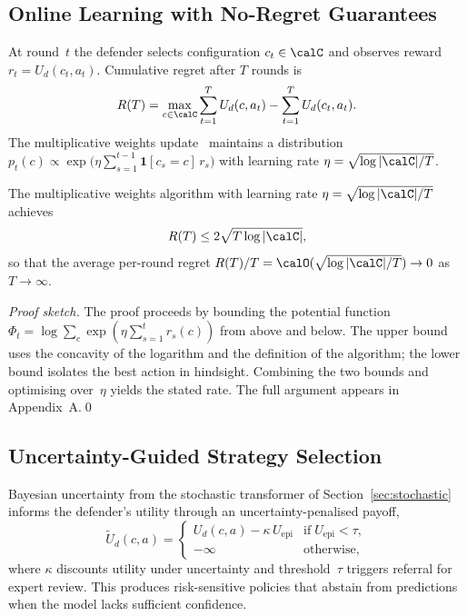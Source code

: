 \subsection{Online Learning with No-Regret Guarantees}

At round~$t$ the defender selects configuration $c_t\in\calC$ and observes reward $r_t=U_d(c_t,a_t)$. Cumulative regret after $T$ rounds is
\begin{equation}
R(T)
= \max_{c\in\calC}\sum_{t=1}^{T}U_d(c,a_t)
  - \sum_{t=1}^{T}U_d(c_t,a_t).
\label{eq:game_regret}
\end{equation}
The multiplicative weights update~\cite{AroraHK2012,CesaBianchi2006} maintains a distribution $p_t(c)\propto\exp\!\bigl(\eta\sum_{s=1}^{t-1}\mathbf{1}[c_s{=}c]\,r_s\bigr)$ with learning rate $\eta=\sqrt{\log|\calC|/T}$.

\begin{theorem}
\label{thm:regret}
The multiplicative weights algorithm with learning rate $\eta=\sqrt{\log|\calC|/T}$ achieves
\begin{equation}
R(T)\le 2\sqrt{T\log|\calC|},
\label{eq:game_regret_bound}
\end{equation}
so that the average per-round regret $R(T)/T=\calO(\sqrt{\log|\calC|/T})\to 0$ as $T\to\infty$.
\end{theorem}

\noindent\textit{Proof sketch.} The proof proceeds by bounding the potential function $\Phi_t=\log\sum_c\exp(\eta\sum_{s=1}^{t}r_s(c))$ from above and below. The upper bound uses the concavity of the logarithm and the definition of the algorithm; the lower bound isolates the best action in hindsight. Combining the two bounds and optimising over~$\eta$ yields the stated rate. The full argument appears in Appendix~A.\qed

\subsection{Uncertainty-Guided Strategy Selection}

Bayesian uncertainty from the stochastic transformer of Section~\ref{sec:stochastic} informs the defender's utility through an uncertainty-penalised payoff,
\begin{equation}
\tilde{U}_d(c,a)
= \begin{cases}
U_d(c,a) - \kappa\,U_{\mathrm{epi}} & \text{if}\;U_{\mathrm{epi}}<\tau,\\
-\infty & \text{otherwise},
\end{cases}
\label{eq:game_unc}
\end{equation}
where $\kappa$ discounts utility under uncertainty and threshold~$\tau$ triggers referral for expert review. This produces risk-sensitive policies that abstain from predictions when the model lacks sufficient confidence.

